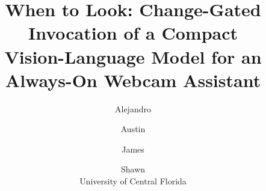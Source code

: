 \documentclass[10pt,twocolumn,letterpaper]{article}
\title{When to Look: Change-Gated Invocation of a Compact\\Vision-Language Model for an Always-On Webcam Assistant}
\author{Alejandro \TODO{surname} \and Austin \TODO{surname} \and James \TODO{surname} \and Shawn \TODO{surname}\\
University of Central Florida\\
{\tt\small \TODO{emails}}}
\begin{document}
\maketitle










{
    \small
    
    
}
\end{document}
